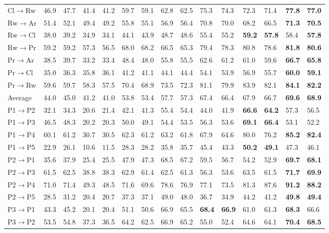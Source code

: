 \documentclass[journal]{IEEEtran}
\begin{document}
\begin{table*}[t]
\begin{tabular}{p{0.75cm}p{0.5cm}p{0.5cm}p{0.5cm}p{0.5cm}p{0.5cm}p{0.5cm}p{0.5cm}p{0.5cm}p{0.5cm}p{0.5cm}p{0.5cm}p{0.5cm}p{0.5cm}p{0.5cm}}
Cl$\rightarrow$Rw &46.9&47.7&41.4&41.2&59.7&59.1&62.8&62.5&75.3&74.3&72.3&71.4&\textbf{77.8}&\textbf{77.0}\\
Rw$\rightarrow$Ar &51.4&52.1&49.4&49.2&55.8&55.1&56.9&56.4&70.8&70.0&68.2&66.5&\textbf{71.3}&\textbf{70.5}\\
Rw$\rightarrow$Cl &38.0&39.2&34.9&34.1&44.1&43.9&48.7&48.6&55.4&55.2&\textbf{59.2}&\textbf{57.8}&{58.4}&\textbf{57.8}\\
Rw$\rightarrow$Pr &59.2&59.2&57.3&56.5&68.0&68.2&66.5&65.3&79.4&78.3&80.8&78.6&\textbf{81.8}&\textbf{80.6}\\
Pr$\rightarrow$Ar &38.5&39.7&33.2&33.4&48.4&48.0&55.8&55.5&62.6&61.2&61.0&59.6&\textbf{66.7}&\textbf{65.8}\\
Pr$\rightarrow$Cl &35.0&36.3&35.8&36.1&41.2&41.1&44.1&44.4&54.1&53.9&56.9&55.7&\textbf{60.0}&\textbf{59.1}\\
Pr$\rightarrow$Rw &59.6&59.7&58.3&57.5&70.4&68.9&73.5&72.3&81.1&79.9&83.9&82.1&\textbf{84.1}&\textbf{82.2}\\
\hline
Average &44.0&45.0&41.2&41.0&53.8&53.4&57.7&57.3&67.4&66.4&67.9&66.7&\textbf{69.6}&\textbf{68.9}\\
\hline
\hline
P1$\rightarrow$P2  &32.1&34.3&20.6&21.4&42.1&41.3&55.4&54.4&44.0&41.9&\textbf{66.6}&\textbf{64.2}&57.3&56.5\\
P1$\rightarrow$P3 &46.5&48.3&20.2&20.3&50.0&49.1&54.4&53.5&56.3&53.6&\textbf{69.1}&\textbf{66.4}&53.1&52.2\\
P1$\rightarrow$P4 &60.1&61.2&30.7&30.5&62.3&61.2&63.2&61.8&67.9&64.6&{80.0}&{76.2}&\textbf{85.2}&\textbf{82.4}\\
P1$\rightarrow$P5 &22.9&26.1&10.6&11.5&28.3&28.2&35.8&35.7&45.4&43.3&\textbf{50.2}&\textbf{49.1}&47.3&46.1\\
P2$\rightarrow$P1 &35.6&37.9&25.4&25.5&47.9&47.3&{68.5}&67.2&59.5&56.7&54.2&52.9&\textbf{69.7}&\textbf{68.1}\\
P2$\rightarrow$P3 &61.5&62.5&38.8&38.3&62.9&61.4&62.5&61.3&56.3&53.6&63.5&61.5&\textbf{71.7}&\textbf{69.9}\\
P2$\rightarrow$P4 &71.0&71.4&49.3&48.5&71.6&69.6&78.6&76.9&77.1&73.5&81.3&87.6&\textbf{91.2}&\textbf{88.2}\\
P2$\rightarrow$P5 &28.5&31.2&20.4&20.7&37.3&37.1&{49.0}&{48.0}&36.7&34.9&{44.2}&{41.2}&\textbf{49.8}&\textbf{49.4}\\
P3$\rightarrow$P1 &43.3&45.2&20.1&20.4&51.1&50.6&66.9&65.5&\textbf{68.4}&\textbf{66.9}&61.0&61.3&\textbf{68.3}&{66.6}\\
P3$\rightarrow$P2 &53.5&54.8&37.3&36.5&64.2&62.5&66.9&65.2&55.0&52.4&64.6&64.1&\textbf{70.4}&\textbf{68.5}\\

\end{tabular}
\end{table*}
\end{document}
